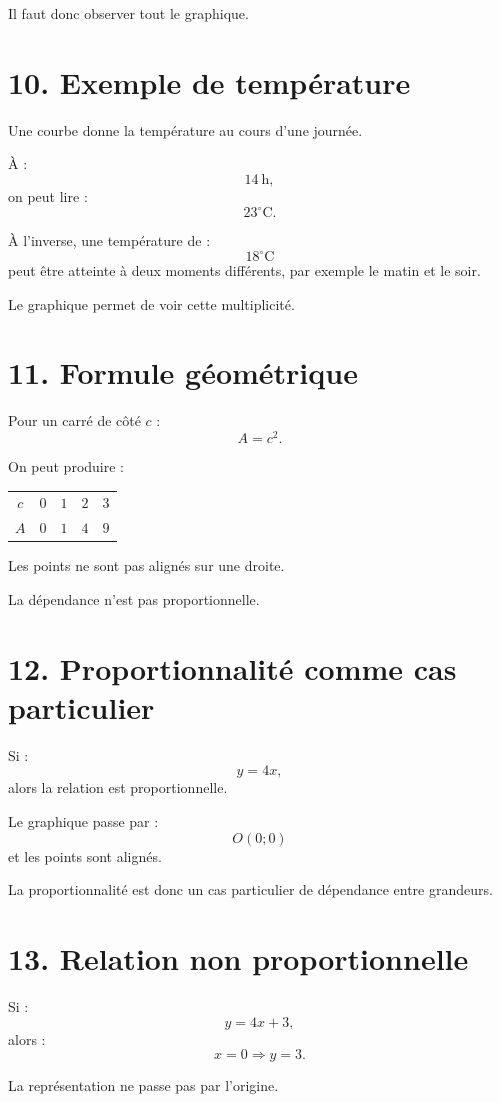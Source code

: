 Il faut donc observer tout le graphique.

\section{10. Exemple de température}

Une courbe donne la température au cours d'une journée.

À :
\[
14\ \text{h},
\]
on peut lire :
\[
23^\circ\text{C}.
\]

À l'inverse, une température de :
\[
18^\circ\text{C}
\]
peut être atteinte à deux moments différents, par exemple le matin et le soir.

Le graphique permet de voir cette multiplicité.

\section{11. Formule géométrique}

Pour un carré de côté $c$ :
\[
A=c^2.
\]

On peut produire :

\begin{tabular}{c|c|c|c|c}
$c$ & $0$ & $1$ & $2$ & $3$ \\
$A$ & $0$ & $1$ & $4$ & $9$ \\
\end{tabular}

Les points ne sont pas alignés sur une droite.

La dépendance n'est pas proportionnelle.

\section{12. Proportionnalité comme cas particulier}

Si :
\[
y=4x,
\]
alors la relation est proportionnelle.

Le graphique passe par :
\[
O(0;0)
\]
et les points sont alignés.

La proportionnalité est donc un cas particulier de dépendance entre grandeurs.

\section{13. Relation non proportionnelle}

Si :
\[
y=4x+3,
\]
alors :
\[
x=0\Rightarrow y=3.
\]

La représentation ne passe pas par l'origine.

